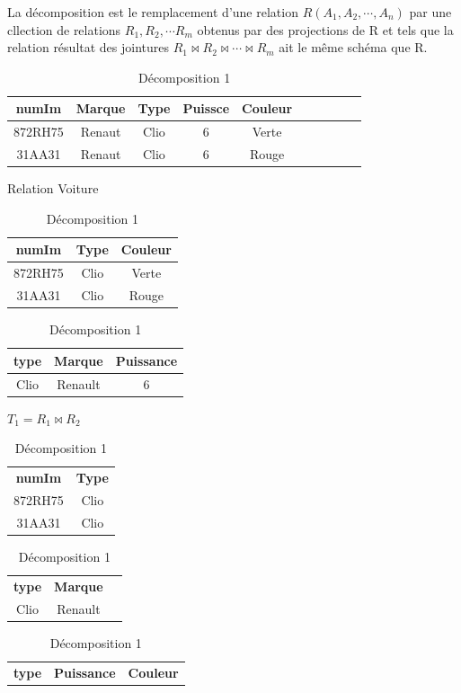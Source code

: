 \documentclass[12pt,a4paper,openany]{book}
\begin{document}
		\begin{definition}
			La décomposition est le remplacement d'une relation $R(A_1,A_2,\cdots,A_n)$ par une cllection de relations $R_1,R_2,\cdots R_m$ obtenus par
			des projections de R et tels que la relation résultat des jointures $R_1\bowtie R_2\bowtie \cdots \bowtie R_m$ ait le même schéma que R.
		\end{definition}

		\begin{exemple}
		\begin{table}[H]
			\centering
				\begin{tabular}{cccccccccc}
					\textbf{numIm} & \textbf{Marque} & \textbf{Type} & \textbf{Puissce} & \textbf{Couleur} \\
					\hline
					872RH75 & Renaut & Clio & 6 & Verte\\ 
					31AA31 & Renaut & Clio & 6 & Rouge\\
				\end{tabular}
				\caption{Relation Voiture}
				\begin{tabular}{ccc}
					\textbf{numIm} & \textbf{Type} & \textbf{Couleur} \\
					\hline
					872RH75 & Clio & Verte\\ 
					31AA31 & Clio & Rouge\\
				\end{tabular}\hspace{20px}
				\begin{tabular}{ccc}
					\textbf{type} & \textbf{Marque} & \textbf{Puissance}\\
					\hline
					Clio & Renault & 6\\
				\end{tabular}
				\caption{Décomposition 1}
				$T_1 = R_1 \bowtie R_2$\\
				\begin{tabular}{cc}
					\textbf{numIm} & \textbf{Type} \\
					872RH75 & Clio\\ 
					31AA31 & Clio\\
				\end{tabular}
				\begin{tabular}{ccc}
					\textbf{type} & \textbf{Marque}\\
					Clio & Renault\\
				\end{tabular} 
				\begin{tabular}{ccc}
					\textbf{type} & \textbf{Puissance} & \textbf{Couleur}\\

\end{tabular}
\end{table}
\end{exemple}
\end{document}
